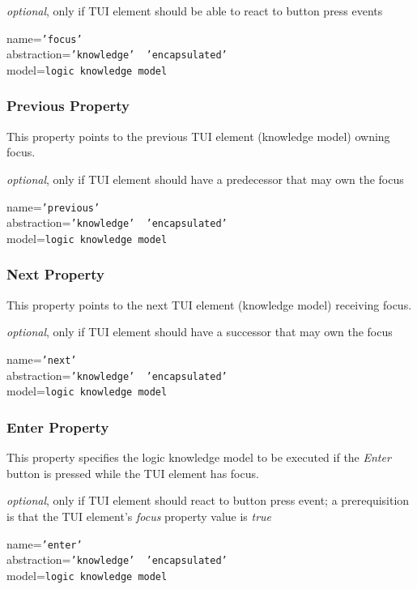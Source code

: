 \emph{optional}, only if TUI element should be able to react to button press events

name=\texttt{'focus'}\\
abstraction=\texttt{'knowledge' \vline\ 'encapsulated'}\\
model=\texttt{logic knowledge model}

\subsubsection{Previous Property}

This property points to the previous TUI element (knowledge model) owning focus.

\emph{optional}, only if TUI element should have a predecessor that may own the focus

name=\texttt{'previous'}\\
abstraction=\texttt{'knowledge' \vline\ 'encapsulated'}\\
model=\texttt{logic knowledge model}

\subsubsection{Next Property}

This property points to the next TUI element (knowledge model) receiving focus.

\emph{optional}, only if TUI element should have a successor that may own the focus

name=\texttt{'next'}\\
abstraction=\texttt{'knowledge' \vline\ 'encapsulated'}\\
model=\texttt{logic knowledge model}

\subsubsection{Enter Property}

This property specifies the logic knowledge model to be executed if the
\emph{Enter} button is pressed while the TUI element has focus.

\emph{optional}, only if TUI element should react to button press event;
a prerequisition is that the TUI element's \emph{focus} property value is \emph{true}

name=\texttt{'enter'}\\
abstraction=\texttt{'knowledge' \vline\ 'encapsulated'}\\
model=\texttt{logic knowledge model}

